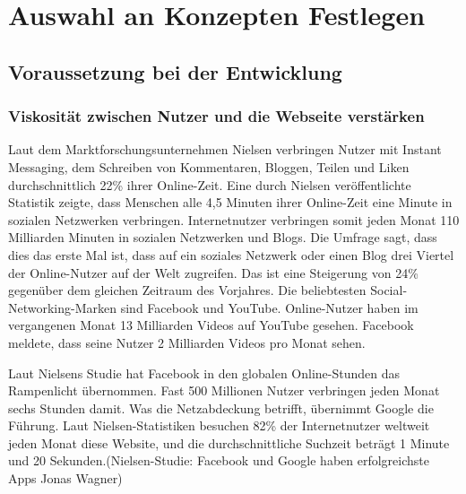 
\chapter{Auswahl an Konzepten Festlegen}


\section{Voraussetzung bei der Entwicklung}


\subsection{Viskosität zwischen Nutzer und die Webseite verstärken}


Laut dem Marktforschungsunternehmen Nielsen verbringen Nutzer mit Instant Messaging, dem Schreiben von Kommentaren, Bloggen, Teilen und \glqq{}Liken\grqq{} durchschnittlich 22\% ihrer Online-Zeit. Eine durch Nielsen veröffentlichte Statistik zeigte, dass Menschen alle 4,5 Minuten ihrer Online-Zeit eine Minute in sozialen Netzwerken verbringen. Internetnutzer verbringen somit jeden Monat 110 Milliarden Minuten in sozialen Netzwerken und Blogs. Die Umfrage sagt, dass dies das erste Mal ist, dass auf ein soziales Netzwerk oder einen Blog \glqq{}drei Viertel der Online-Nutzer auf der Welt zugreifen.\grqq{} Das ist eine Steigerung von 24\% gegenüber dem gleichen Zeitraum des Vorjahres. Die beliebtesten Social-Networking-Marken sind Facebook und YouTube. Online-Nutzer haben im vergangenen Monat 13 Milliarden Videos auf YouTube gesehen. Facebook meldete, dass seine Nutzer 2 Milliarden Videos pro Monat sehen.


Laut Nielsens Studie hat Facebook in den globalen Online-Stunden das Rampenlicht übernommen. Fast 500 Millionen Nutzer verbringen jeden Monat sechs Stunden damit.
Was die Netzabdeckung betrifft, übernimmt Google die Führung. Laut Nielsen-Statistiken besuchen 82\% der Internetnutzer weltweit jeden Monat diese Website, und die durchschnittliche Suchzeit beträgt 1 Minute und 20 Sekunden.(Nielsen-Studie: Facebook und Google haben erfolgreichste Apps Jonas Wagner)

